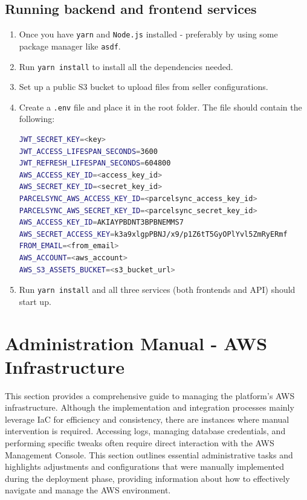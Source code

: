 \subsection{Running backend and frontend services}
\begin{enumerate}
    \item Once you have \texttt{yarn} and \texttt{Node.js} installed - preferably by using some package manager like \texttt{asdf}.
    \item Run \texttt{yarn install} to install all the dependencies needed.
    \item Set up a public S3 bucket to upload files from seller configurations. 
    \item Create a \texttt{.env} file and place it in the root folder. The file should contain the following:
\begin{lstlisting}[language=bash,caption={Platform local environment configuration}]
JWT_SECRET_KEY=<key>
JWT_ACCESS_LIFESPAN_SECONDS=3600
JWT_REFRESH_LIFESPAN_SECONDS=604800
AWS_ACCESS_KEY_ID=<access_key_id>
AWS_SECRET_KEY_ID=<secret_key_id>
PARCELSYNC_AWS_ACCESS_KEY_ID=<parcelsync_access_key_id>
PARCELSYNC_AWS_SECRET_KEY_ID=<parcelsync_secret_key_id>
AWS_ACCESS_KEY_ID=AKIAYPBDNT3BPBNEMMS7
AWS_SECRET_ACCESS_KEY=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
FROM_EMAIL=<from_email>
AWS_ACCOUNT=<aws_account>
AWS_S3_ASSETS_BUCKET=<s3_bucket_url>
\end{lstlisting}
    \item Run \texttt{yarn install} and all three services (both frontends and API) should start up.
\end{enumerate}
    

\section{Administration Manual - AWS Infrastructure}
\label{attachments:admin-manual-aws-platform}
This section provides a comprehensive guide to managing the platform's AWS infrastructure. 
Although the implementation and integration processes mainly leverage \ac{IaC} for efficiency and consistency, there are instances where manual intervention is required. 
Accessing logs, managing database credentials, and performing specific tweaks often require direct interaction with the AWS Management Console. 
This section outlines essential administrative tasks and highlights adjustments and configurations that were manually implemented during the deployment phase, providing information about how to effectively navigate and manage the AWS environment.

